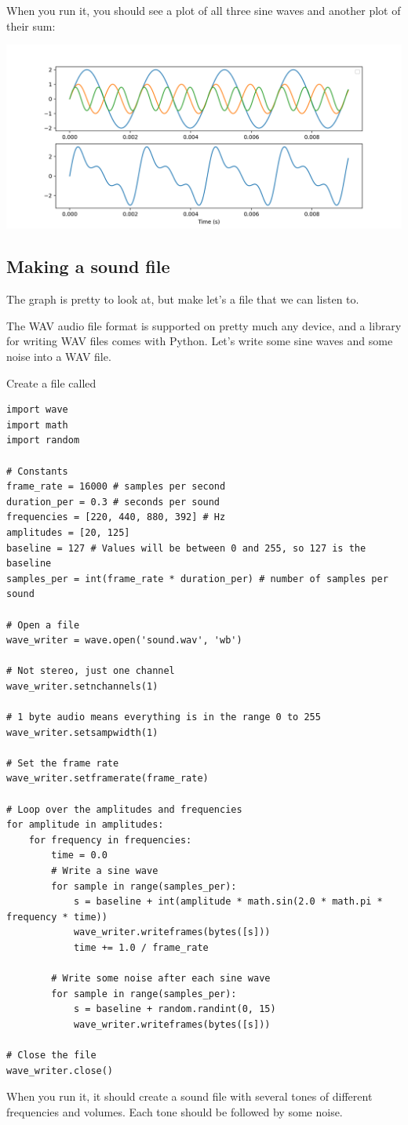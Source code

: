 When you run it, you should see a plot of all three sine waves and another plot of their sum:

\includegraphics[width=0.9\linewidth]{harmonicspy.png}

\subsection{Making a sound file}

The graph is pretty to look at, but make let's a file that we can listen to.

The WAV audio file format is supported on pretty much any device, and
a library for writing WAV files comes with Python. Let's write some
sine waves and some noise into a WAV file.

Create a file called 

\begin{Verbatim}
import wave
import math
import random

# Constants
frame_rate = 16000 # samples per second
duration_per = 0.3 # seconds per sound
frequencies = [220, 440, 880, 392] # Hz
amplitudes = [20, 125]
baseline = 127 # Values will be between 0 and 255, so 127 is the baseline
samples_per = int(frame_rate * duration_per) # number of samples per sound

# Open a file
wave_writer = wave.open('sound.wav', 'wb')

# Not stereo, just one channel
wave_writer.setnchannels(1)

# 1 byte audio means everything is in the range 0 to 255
wave_writer.setsampwidth(1)

# Set the frame rate
wave_writer.setframerate(frame_rate)

# Loop over the amplitudes and frequencies
for amplitude in amplitudes:
    for frequency in frequencies:
        time = 0.0
        # Write a sine wave
        for sample in range(samples_per):
            s = baseline + int(amplitude * math.sin(2.0 * math.pi * frequency * time))
            wave_writer.writeframes(bytes([s]))
            time += 1.0 / frame_rate
            
        # Write some noise after each sine wave
        for sample in range(samples_per):
            s = baseline + random.randint(0, 15)
            wave_writer.writeframes(bytes([s]))
            
# Close the file
wave_writer.close()
\end{Verbatim}

When you run it, it should create a sound file with several tones of
different frequencies and volumes. Each tone should be followed by
some noise.
